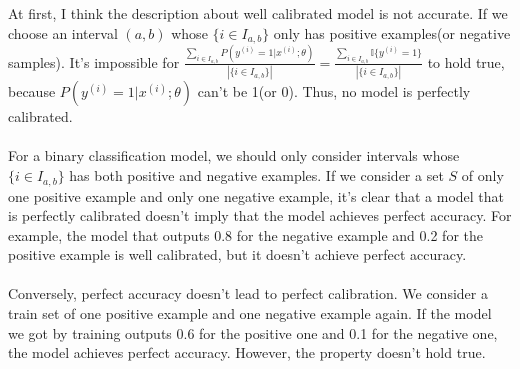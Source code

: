 \begin{answer}
At first, I think the description about well calibrated model is not accurate. If we choose an interval $(a, b)$ whose $\{i \in I_{a, b}\}$ only has positive examples(or negative samples). It's impossible for $\frac{\sum_{i\in I_{a, b}}P(y^{(i)}=1|x^{(i)};\theta)}{|\{i\in I_{a,b}\}|} = \frac{\sum_{i\in I_{a, b}}\mathbb{I}\{y^{(i)}=1\}}{|\{i\in I_{a, b}\}|}$ to hold true, because $P(y^{(i)}=1|x^{(i)};\theta)$ can't be 1(or 0). Thus, no model is perfectly calibrated.\\ \\
For a binary classification model, we should only consider intervals whose $\{i \in I_{a, b}\}$ has both positive and negative examples. If we consider a set $S$ of only one positive example and only one negative example, it's clear that a model that is perfectly calibrated doesn't imply that the model achieves perfect accuracy. For example, the model that outputs 0.8 for the negative example and 0.2 for the positive example is well calibrated, but it doesn't achieve perfect accuracy.\\ \\
Conversely, perfect accuracy doesn't lead to perfect calibration. We consider a train set of one positive example and one negative example again. If the model we got by training outputs 0.6 for the positive one and 0.1 for the negative one, the model achieves perfect accuracy. However, the property doesn't hold true.
\end{answer}

